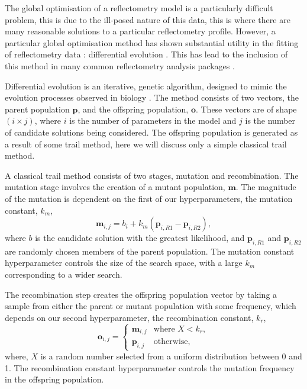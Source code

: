 \documentclass[
 reprint,
 superscriptaddress,
 amsmath,amssymb,
 aps,
]{revtex4-1}
\begin{document}
The global optimisation of a reflectometry model is a particularly difficult problem, this is due to the ill-posed nature of this data, this is where there are many reasonable solutions to a particular reflectometry profile.
However, a particular global optimisation method has shown substantial utility in the fitting of reflectometry data \cite{varderlee_comparison_2007}: differential evolution \cite{wormington_characterization_1999}.
This has lead to the inclusion of this method in many common reflectometry analysis packages \cite{bjorck_fitting_2011}.

Differential evolution is an iterative, genetic algorithm, designed to mimic the evolution processes observed in biology \cite{holland_adaptation_1992}.
The method consists of two vectors, the parent population $\mathbf{p}$, and the offspring population, $\mathbf{o}$.
These vectors are of shape $(i \times j)$, where $i$ is the number of parameters in the model and $j$ is the number of candidate solutions being considered.
The offspring population is generated as a result of some trail method, here we will discuss only a simple classical trail method.

A classical trail method consists of two stages, mutation and recombination.
The mutation stage involves the creation of a mutant population, $\mathbf{m}$.
The magnitude of the mutation is dependent on the first of our hyperparameters, the mutation constant, $k_m$,
%
\begin{equation}
    \mathbf{m}_{i,j} = b_i + k_m (\mathbf{p}_{i, R1} - \mathbf{p}_{i, R2}),
\end{equation}
%
where $b$ is the candidate solution with the greatest likelihood, and $\mathbf{p}_{i, R1}$ and $\mathbf{p}_{i, R2}$ are randomly chosen members of the parent population.
The mutation constant hyperparameter controls the size of the search space, with a large $k_m$ corresponding to a wider search.

The recombination step creates the offspring population vector by taking a sample from either the parent or mutant population with some frequency, which depends on our second hyperparameter, the recombination constant, $k_r$,
%
\begin{equation}
    \mathbf{o}_{i, j} =
    \begin{cases}
        \mathbf{m}_{i, j} & \text{where } X < k_r,\\
        \mathbf{p}_{i, j} & \text{otherwise},
    \end{cases}
\end{equation}
%
where, $X$ is a random number selected from a uniform distribution between 0 and 1.
The recombination constant hyperparameter controls the mutation frequency in the offspring population.
\end{document}
